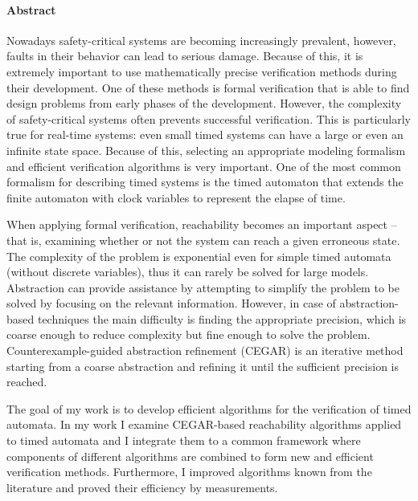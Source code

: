 \cleardoublepage

\paragraph*{Abstract}
{}
\thispagestyle{plain}

Nowadays safety-critical systems are becoming increasingly prevalent, however, faults in their behavior can lead to serious damage. Because of this, it is extremely important to use mathematically precise verification methods during their development. One of these methods is formal verification that is able to find design problems from early phases of the development. However, the complexity of safety-critical systems often prevents successful verification. This is particularly true for real-time systems: even small timed systems can have a large or even an infinite state space. Because of this, selecting an appropriate modeling formalism and efficient verification algorithms is very important. One of the most common formalism for describing timed systems is the timed automaton that extends the finite automaton with clock variables to represent the elapse of time.


When applying formal verification, reachability becomes an important aspect – that is, examining whether or not the system can reach a given erroneous state. The complexity of the problem is exponential even for simple timed automata (without discrete variables), thus it can rarely be solved for large models. Abstraction can provide assistance by attempting to simplify the problem to be solved by focusing on the relevant information. However, in case of abstraction-based techniques the main difficulty is finding the appropriate precision, which is coarse enough to reduce complexity but fine enough to solve the problem. Counterexample-guided abstraction refinement (CEGAR) is an iterative method starting from a coarse abstraction and refining it until the sufficient precision is reached.


The goal of my work is to develop efficient algorithms for the verification of timed automata. In my work I examine CEGAR-based reachability algorithms applied to timed automata and I integrate them to a common framework where components of different algorithms are combined to form new and efficient verification methods. Furthermore, I improved algorithms known from the literature and proved their efficiency by measurements.


